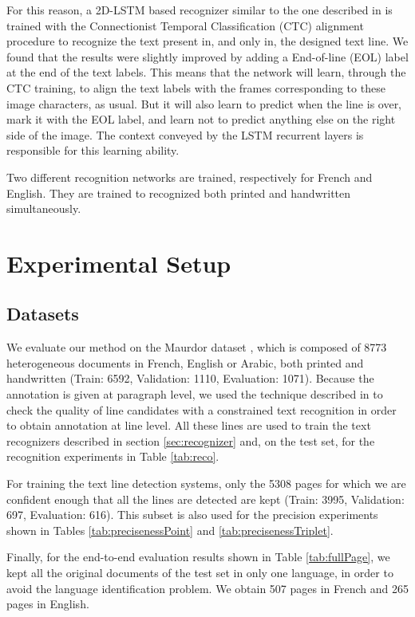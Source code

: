\documentclass[conference]{IEEEtran}
\begin{document}
For this reason, a 2D-LSTM based recognizer similar to the one described in \cite{pham2014dropout} is trained with the Connectionist Temporal Classification \cite{Graves06connectionisttemporal} (CTC) alignment procedure to recognize the text present in, and only in, the designed text line. We found that the results were slightly improved by adding a End-of-line (EOL) label at the end of the text labels.
This  means that the network will learn, through the CTC training, to align the text labels with the frames corresponding to these image characters, as usual. But it will also learn to predict when the line is over, mark it with the EOL label, and learn  not to predict anything else on the right side of the image. The context conveyed by the LSTM recurrent layers is responsible for this learning ability.

Two different recognition networks are trained, respectively for French and English. They are trained to recognized both printed and handwritten simultaneously.

\section{Experimental Setup}
\label{sec:experimental}
\subsection{Datasets}
We evaluate our method on the Maurdor dataset \cite{Brunessaux2014}, which is composed of 8773 heterogeneous documents in French, English or Arabic, both printed and handwritten (Train: 6592, Validation: 1110, Evaluation: 1071). Because the annotation is given at paragraph level, we used the technique described in \cite{bluche2014automatic} to check the quality of line candidates with a constrained text recognition in order to obtain annotation at line level. All these lines are used to train the text recognizers described in section \ref{sec:recognizer} and, on the test set, for the recognition experiments in Table \ref{tab:reco}.

For training the text line detection systems, only the 5308 pages for which we are confident enough that all the lines are detected are kept (Train: 3995, Validation: 697, Evaluation: 616). This subset is also used for the precision experiments shown in Tables \ref{tab:precisenessPoint} and \ref{tab:precisenessTriplet}.

Finally, for the end-to-end evaluation results shown in Table \ref{tab:fullPage}, we kept all the original documents of the test set in only one language, in order to avoid the language identification problem. We obtain 507 pages in French and 265 pages in English.
\end{document}
